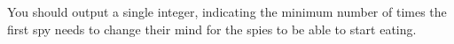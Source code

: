 You should output a single integer, indicating the minimum number of times the first spy needs to change their mind for the spies to be able to start eating.